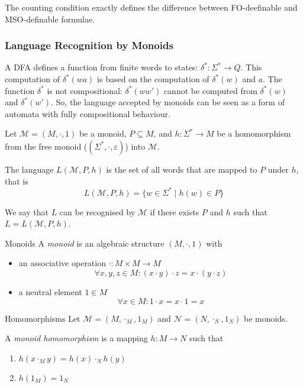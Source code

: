 \documentclass[english]{panikzettel}
\begin{document}
The counting condition exactly defines the difference between FO-deefinable and MSO-definable formulae.

\subsubsection{Language Recognition by Monoids}
\label{sssec:monoids}
\begin{halfboxl}
    A DFA defines a function from finite words to states: $\delta^* : \Sigma^* \rightarrow Q$.
    This computation of $\delta^*(wa)$ is based on the computation of $\delta^*(w)$ and $a$.
    The function $\delta^*$ is not compositional: $\delta^*(ww')$ cannot be computed from $\delta^*(w)$ and $\delta^*(w')$.
    So, the language accepted by monoids can be seen as a form of automata with fully compositional behaviour.

    Let $\mathcal{M}=(M,\cdot,1)$ be a monoid, $P \subseteq M$, and $h: \Sigma^* \rightarrow M$ be a homomorphism from the free monoid ($(\Sigma^*,\cdot, \varepsilon)$) into $\mathcal{M}$.

    The language $L(\mathcal{M},P,h)$ is the set of all words that are mapped to $P$ under $h$, that is
    $$L(\mathcal{M},P,h)=\{w \in \Sigma^* \mid h(w) \in P\}$$

    We say that $L$ can be recognised by $\mathcal{M}$ if there exists $P$ and $h$ such that $L=L(\mathcal{M},P,h)$.
\end{halfboxl}%
\begin{halfboxr}
    \vspace{-\baselineskip}
    \begin{defi}{Monoids}
        A \emph{monoid} is an algebraic structure $(M, \cdot,1)$ with
        \begin{itemize}[leftmargin=*]
            \item an associative operation $\cdot : M \times M \rightarrow M$
            $$\forall x,y,z \in M : (x \cdot y) \cdot z = x \cdot (y \cdot z)$$
            \item a neutral element $1 \in M$
            $$\forall x \in M : 1 \cdot x = x \cdot 1 = x$$
        \end{itemize}
    \end{defi}

    \begin{defi}{Homomorphisms}
        Let $\mathcal{M}=(M,\cdot_M, 1_M)$ and $\mathcal{N}=(N,\cdot_N,1_N)$ be monoids.

        A \emph{monoid homomorphism} is a mapping $h : M \rightarrow N$ such that
        \begin{enumerate}
            \item $h(x \cdot_M y)=h(x) \cdot_N h(y)$
            \item $h(1_M)=1_N$
        \end{enumerate}
    \end{defi}
\end{halfboxr}
\end{document}
